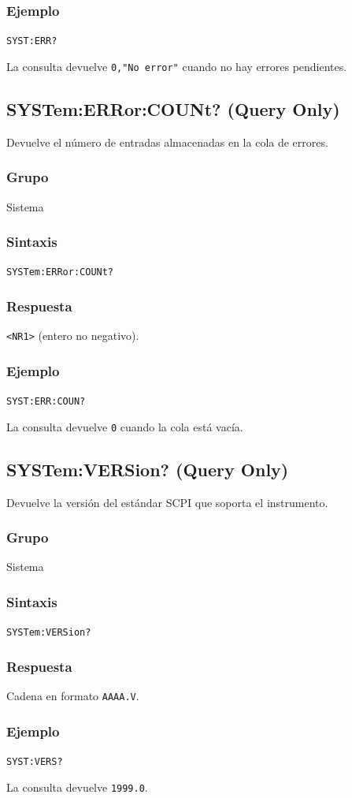 \subsubsection*{Ejemplo}
\texttt{SYST:ERR?}

La consulta devuelve \texttt{0,"No error"} cuando no hay errores
pendientes.

\subsection*{SYSTem:ERRor:COUNt? (Query Only)}

Devuelve el número de entradas almacenadas en la cola de errores.

\subsubsection*{Grupo}
Sistema

\subsubsection*{Sintaxis}
\texttt{SYSTem:ERRor:COUNt?}

\subsubsection*{Respuesta}
\texttt{<NR1>} (entero no negativo).

\subsubsection*{Ejemplo}
\texttt{SYST:ERR:COUN?}

La consulta devuelve \texttt{0} cuando la cola está vacía.

\subsection*{SYSTem:VERSion? (Query Only)}

Devuelve la versión del estándar SCPI que soporta el instrumento.

\subsubsection*{Grupo}
Sistema

\subsubsection*{Sintaxis}
\texttt{SYSTem:VERSion?}

\subsubsection*{Respuesta}
Cadena en formato \texttt{AAAA.V}.

\subsubsection*{Ejemplo}
\texttt{SYST:VERS?}

La consulta devuelve \texttt{1999.0}.